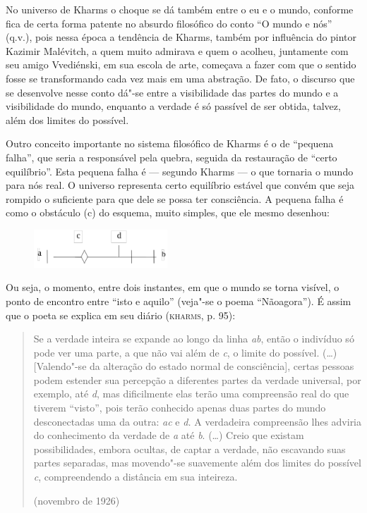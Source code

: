 No universo de Kharms o choque se dá também entre o eu e o mundo,
conforme fica de certa forma patente no absurdo filosófico do conto ``O
mundo e nós'' (q.v.), pois nessa época a tendência de Kharms, também por
influência do pintor Kazimir Malévitch, a quem muito admirava e quem o
acolheu, juntamente com seu amigo Vvediénski, em sua escola de arte,
começava a fazer com que o sentido fosse se transformando cada vez mais
em uma abstração. De fato, o discurso que se desenvolve nesse conto
dá"-se entre a visibilidade das partes do mundo e a visibilidade do
mundo, enquanto a verdade é só passível de ser obtida, talvez, além dos
limites do possível.

Outro conceito importante no sistema filosófico de Kharms é o de
``pequena falha'', que seria a responsável pela quebra, seguida da
restauração de ``certo equilíbrio''. Esta pequena falha é --- segundo
Kharms --- o que tornaria o mundo para nós real. O universo representa
certo equilíbrio estável que convém que seja rompido o suficiente para
que dele se possa ter consciência. A pequena falha é como o obstáculo
(c) do esquema, muito simples, que ele mesmo desenhou:

\begin{figure}[!ht]
\centering
  \includegraphics[width=50mm]{./imgs/fig6.jpg}
\end{figure}

Ou seja, o momento, entre dois instantes, em que o mundo se torna
visível, o ponto de encontro entre ``isto e aquilo'' (veja"-se o poema
``Nãoagora''). É assim que o poeta se explica em seu diário
(\textsc{kharms}, p. 95):

\begin{quote}
Se a verdade inteira se expande ao longo da linha \emph{ab}, então o
indivíduo só pode ver uma parte, a que não vai além de \emph{c}, o
limite do possível. (\ldots{}) {[}Valendo"-se da alteração do estado
normal de consciência{]}, certas pessoas podem estender sua percepção a
diferentes partes da verdade universal, por exemplo, até \emph{d}, mas
dificilmente elas terão uma compreensão real do que tiverem ``visto'',
pois terão conhecido apenas duas partes do mundo desconectadas uma da
outra: \emph{ac} e \emph{d.} A verdadeira compreensão lhes adviria do
conhecimento da verdade de \emph{a} até \emph{b}. (\ldots{}) Creio que
existam possibilidades, embora ocultas, de captar a verdade, não
escavando suas partes separadas, mas movendo"-se suavemente além dos
limites do possível \emph{c}, compreendendo a distância em sua
inteireza.

\begin{flushright}
(novembro de 1926)
\end{flushright}
\end{quote}

